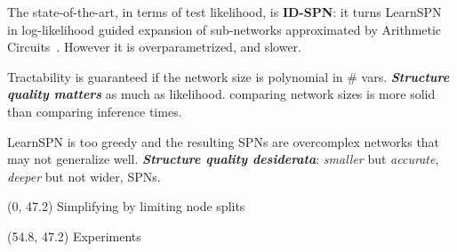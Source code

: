 \documentclass[final]{beamer}
\begin{document}
\begin{frame}{}
\begin{textblock}{25.2}

    The state-of-the-art, in terms of test likelihood, is \textbf{ID-SPN}: it turns LearnSPN in log-likelihood guided expansion of sub-networks
    approximated by Arithmetic
    Circuits~\emph{\parencite{Rooshenas2014}}. However it is
    overparametrized, and slower.\par\bigskip
    
    
    Tractability is guaranteed if the network size is polynomial in \#
    vars. \emph{\textbf{Structure quality matters}} as much as likelihood. comparing network sizes is more solid than comparing inference times.\par\bigskip

    LearnSPN is too greedy and the resulting SPNs are overcomplex
    networks that may not generalize well. \textbf{\emph{Structure quality desiderata}}: \emph{smaller} but \emph{accurate}, \emph{deeper} but not wider, SPNs. 

  \end{textblock}
  
  
  \begin{textblock}{80}(0, 47.2)
    Simplifying by limiting node splits
  \end{textblock}

  \begin{textblock}{20}(54.8, 47.2)
    Experiments
  \end{textblock}
  

\end{frame}
\end{document}
